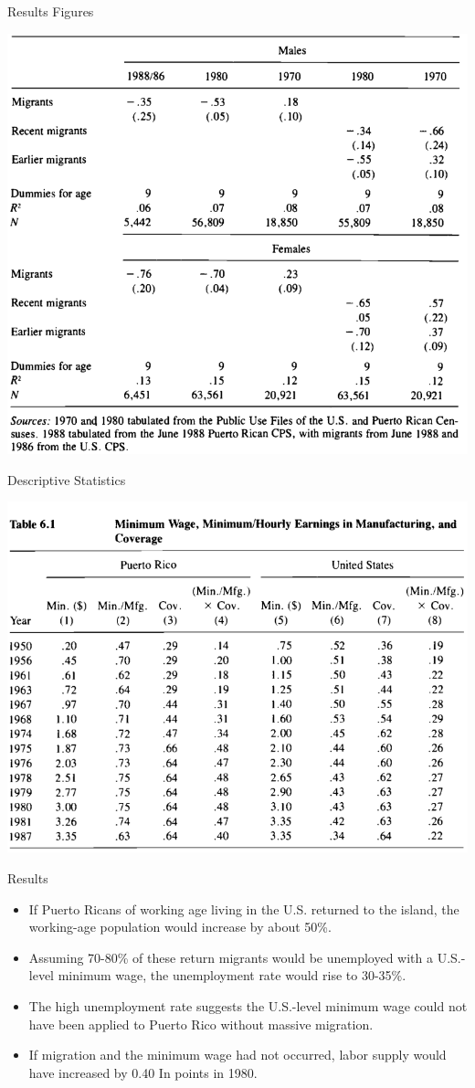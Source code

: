 \documentclass[12pt]{beamer}
\begin{document}
\begin{frame}[allowframebreaks]{Results Figures}
	\begin{center}
		\includegraphics[width=.8\linewidth]{assets/results.png}
	\end{center}
\end{frame}

\begin{frame}[allowframebreaks]{Descriptive Statistics}
	\begin{center}
		\includegraphics[width=.8\linewidth]{assets/discriptive.png}
	\end{center}
\end{frame}

\begin{frame}[allowframebreaks]{Results}
	\begin{itemize}
		\item If Puerto Ricans of working age living in the U.S. returned to the island, the working-age population would increase by about 50\%.
		\item Assuming 70-80\% of these return migrants would be unemployed with a U.S.-level minimum wage, the unemployment rate would rise to 30-35\%.
		\item The high unemployment rate suggests the U.S.-level minimum wage could not have been applied to Puerto Rico without massive migration.
		\item If migration and the minimum wage had not occurred, labor supply would have increased by 0.40 In points in 1980.
	\end{itemize}
\end{frame}
\end{document}
